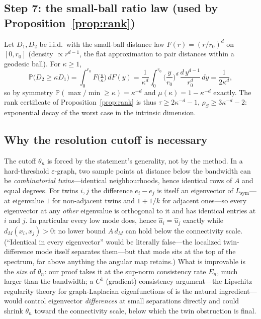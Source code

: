 \documentclass[review,supplement]{siamart220329}
\begin{document}
\subsection*{Step 7: the small-ball ratio law (used by Proposition~\ref{prop:rank})}
Let $D_1,D_2$ be i.i.d.\ with the small-ball distance law
$F(r)=(r/r_0)^d$ on $[0,r_0]$ (density $\propto r^{d-1}$, the flat
approximation to pair distances within a geodesic ball). For $\kappa\ge1$,
\[
\mathbb P\big(D_2\ge\kappa D_1\big)
=\int_0^{r_0}\!F\!\big(\tfrac{y}{\kappa}\big)\,dF(y)
=\frac{1}{\kappa^d}\int_0^{r_0}\Big(\frac{y}{r_0}\Big)^{d}\,
\frac{d\,y^{d-1}}{r_0^{d}}\,dy
=\frac{1}{2\kappa^d},
\]
so by symmetry $\mathbb P(\max/\min\ge\kappa)=\kappa^{-d}$ and
$\mu(\kappa)=1-\kappa^{-d}$ exactly. The rank certificate of
Proposition~\ref{prop:rank} is thus $\tau\ge2\kappa^{-d}-1$,
$\rho_S\ge3\kappa^{-d}-2$: exponential decay of the worst case in the
intrinsic dimension.

\subsection*{Why the resolution cutoff is necessary}
The cutoff $\theta_n$ is forced by the statement's generality, not by the
method. In a hard-threshold $\varepsilon$-graph, two sample points at distance
below the bandwidth can be \emph{combinatorial twins}---identical
neighbourhoods, hence identical rows of $A$ and equal degrees. For twins
$i,j$ the difference $e_i-e_j$ is itself an eigenvector of
$L_{\mathrm{sym}}$---at eigenvalue $1$ for non-adjacent twins and $1+1/k$ for
adjacent ones---so every eigenvector at any \emph{other} eigenvalue is
orthogonal to it and has identical entries at $i$ and $j$. In particular
every low mode does, hence $\hat u_i=\hat u_j$ exactly while
$d_M(x_i,x_j)>0$: no lower bound $A\,d_M$ can hold below the
connectivity scale. (``Identical in every eigenvector'' would be literally
false---the localized twin-difference mode itself separates them---but that
mode sits at the top of the spectrum, far above anything the angular map
retains.) What is improvable is the \emph{size} of $\theta_n$: our
proof takes it at the sup-norm consistency rate $E_n$, much larger than the
bandwidth; a $C^1$ (gradient) consistency argument---the Lipschitz regularity
theory for graph-Laplacian eigenfunctions of \cite{calderlewicka2022} is the
natural ingredient---would control eigenvector \emph{differences} at small
separations directly and could shrink $\theta_n$ toward the connectivity scale,
below which the twin obstruction is final.
\end{document}
